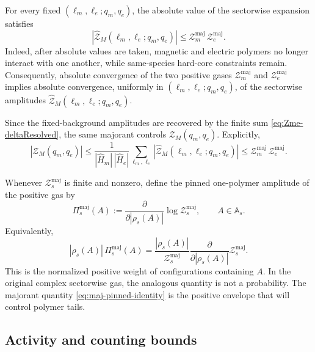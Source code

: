 For every fixed \((\ell_m,\ell_e;q_m,q_e)\), the absolute value of the sectorwise
expansion satisfies
\begin{equation}
	\left|\widehat{\mathcal Z}_M(\ell_m,\ell_e;q_m,q_e)\right|
	\le
	\mathcal Z_m^{\mathrm{maj}}\,
	\mathcal Z_e^{\mathrm{maj}}.
	\label{eq:twisted-sector-majorant-bound}
\end{equation}
Indeed, after absolute values are taken, magnetic and electric polymers no longer interact
with one another, while same-species hard-core constraints remain. Consequently, absolute
convergence of the two positive gases \(\mathcal Z_m^{\mathrm{maj}}\) and
\(\mathcal Z_e^{\mathrm{maj}}\) implies absolute convergence, uniformly in
\((\ell_m,\ell_e;q_m,q_e)\), of the sectorwise amplitudes
\(\widehat{\mathcal Z}_M(\ell_m,\ell_e;q_m,q_e)\).

Since the fixed-background amplitudes are recovered by the finite sum \eqref{eq:Zme-deltaResolved}, the same majorant controls
\(\mathcal Z_M(q_m,q_e)\). Explicitly,
\begin{equation}
	|\mathcal Z_M(q_m,q_e)|
	\le
	\frac{1}{|\widehat H_m|\,|\widehat H_e|}
	\sum_{\ell_m,\ell_e}
	\left|\widehat{\mathcal Z}_M(\ell_m,\ell_e;q_m,q_e)\right|
	\le
	\mathcal Z_m^{\mathrm{maj}}\,
	\mathcal Z_e^{\mathrm{maj}}.
	\label{eq:fixed-charge-majorant-bound}
\end{equation}

Whenever \(\mathcal Z_s^{\mathrm{maj}}\) is finite and nonzero, define the pinned
one-polymer amplitude of the positive gas by
\begin{equation}
	\Pi_s^{\mathrm{maj}}(A)
	:=
	\frac{\partial}{\partial |\rho_s(A)|}
	\log \mathcal Z_s^{\mathrm{maj}},
	\qquad
	A\in\mathbb A_s.
	\label{eq:maj-pinned}
\end{equation}
Equivalently,
\begin{equation}
	|\rho_s(A)|\,\Pi_s^{\mathrm{maj}}(A)
	=
	\frac{|\rho_s(A)|}{\mathcal Z_s^{\mathrm{maj}}}
	\frac{\partial}{\partial |\rho_s(A)|} \mathcal Z_s^{\mathrm{maj}}.
	\label{eq:maj-pinned-identity}
\end{equation}
This is the normalized positive weight of configurations containing \(A\). In the original
complex sectorwise gas, the analogous quantity is not a probability. The majorant
quantity \eqref{eq:maj-pinned-identity} is the positive envelope that will control polymer
tails.




\subsection{Activity and counting bounds}
\label{sec:activity-counting-hypotheses}

